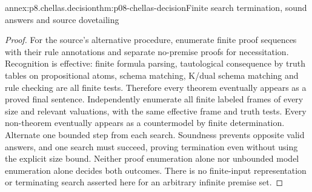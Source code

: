 \begin{annexitem}{annex:p8.chellas.decision}{thm:p08-chellas-decision}{Finite search termination, sound answers and source dovetailing}
\begin{proof}
For the source's alternative procedure, enumerate finite proof
sequences with their rule annotations and separate no-premise
proofs for necessitation. Recognition is effective: finite formula
parsing, tautological consequence by truth tables on propositional
atoms, schema matching, K/dual schema matching and rule checking
are all finite tests. Therefore every theorem eventually appears
as a proved final sentence. Independently enumerate all finite
labeled frames of every size and relevant valuations, with the
same effective frame and truth tests. Every non-theorem eventually
appears as a countermodel by finite determination. Alternate one
bounded step from each search. Soundness prevents opposite valid
answers, and one search must succeed, proving termination even
without using the explicit size bound. Neither proof enumeration
alone nor unbounded model enumeration alone decides both outcomes.
There is no finite-input representation or terminating search
asserted here for an arbitrary infinite premise set.
\end{proof}
\end{annexitem}

